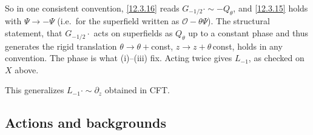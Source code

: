 \begin{tcolorbox}[breakable]
\begin{remark}
		So in one consistent convention, \eqref{12.3.16} reads $G_{-1/2}\cdot\sim-Q_{\theta}$, and \eqref{12.3.15} holds with $\varPsi\to-\varPsi$ (i.e.\ for the superfield written as $\mathcal O-\theta\varPsi$). The structural statement, that $G_{-1/2}\cdot$ acts on superfields as $Q_{\theta}$ up to a constant phase and thus generates the rigid translation $\theta\to\theta+{}$const, $z\to z+\theta\,{}$const, holds in any convention. The phase is what (i)--(iii) fix. Acting twice gives $L_{-1}$, as checked on $X$ above.
	\end{remark}
\end{tcolorbox}
This generalizes $L_{{-}1}\cdot \sim \partial_{z}$ obtained in CFT.

\subsection*{Actions and backgrounds}

